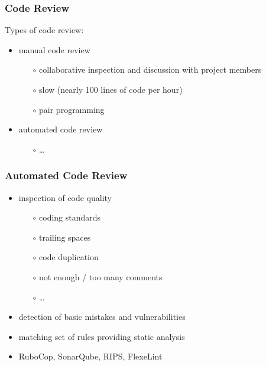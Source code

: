 \documentclass[10pt,xcolor=pdflatex]{beamer}
\begin{document}
\begin{frame}\frametitle{Code Review}
    Types of code review:\\[0.5em]
    \begin{itemize}
        \item manual code review
            \begin{itemize}
                \item[$\circ$] collaborative inspection and discussion with project members\\[0.25em]
                \item[$\circ$] slow (nearly 100 lines of code per hour)\\[0.25em]
                \item[$\circ$] pair programming\\[1em]
            \end{itemize}
        \item automated code review
            \begin{itemize}
                \item[$\circ$] \dots
            \end{itemize}
            
    \end{itemize}
\end{frame}

\begin{frame}\frametitle{Automated Code Review}
    \begin{itemize}
        \item inspection of code quality
            \begin{itemize}
                \item[$\circ$] coding standards
                \item[$\circ$] trailing spaces
                \item[$\circ$] code duplication
                \item[$\circ$] not enough / too many comments
                \item[$\circ$] \dots\\[1em]
            \end{itemize}
        \item detection of basic mistakes and vulnerabilities\\[1em]
        \item matching set of rules providing static analysis\\[1em]
        \item RuboCop, SonarQube, RIPS, FlexeLint
    \end{itemize}
\end{frame}
\end{document}
